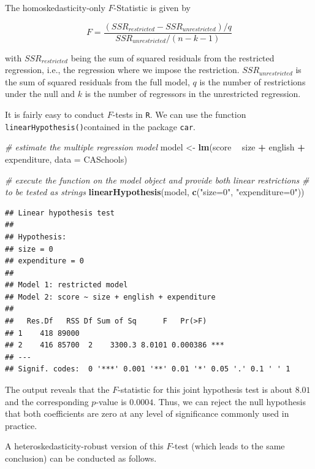 \documentclass[]{book}
\newenvironment{Shaded}{\begin{snugshade}}{\end{snugshade}}
\newcommand{\KeywordTok}[1]{\textcolor[rgb]{0.13,0.29,0.53}{\textbf{#1}}}
\newcommand{\DataTypeTok}[1]{\textcolor[rgb]{0.13,0.29,0.53}{#1}}
\newcommand{\StringTok}[1]{\textcolor[rgb]{0.31,0.60,0.02}{#1}}
\newcommand{\CommentTok}[1]{\textcolor[rgb]{0.56,0.35,0.01}{\textit{#1}}}
\newcommand{\OperatorTok}[1]{\textcolor[rgb]{0.81,0.36,0.00}{\textbf{#1}}}
\newcommand{\NormalTok}[1]{#1}
\theoremstyle{definition}
\theoremstyle{definition}
\theoremstyle{definition}
\theoremstyle{remark}
\begin{document}
The homoskedasticity-only \(F\)-Statistic is given by

\[ F = \frac{(SSR_{restricted} - SSR_{unrestricted})/q}{SSR_{unrestricted} / (n-k-1)} \]

with \(SSR_{restricted}\) being the sum of squared residuals from the
restricted regression, i.e., the regression where we impose the
restriction. \(SSR_{unrestricted}\) is the sum of squared residuals from
the full model, \(q\) is the number of restrictions under the null and
\(k\) is the number of regressors in the unrestricted regression.

It is fairly easy to conduct \(F\)-tests in \texttt{R}. We can use the
function \texttt{linearHypothesis()}contained in the package
\texttt{car}.

\begin{Shaded}
\begin{Highlighting}[]
\CommentTok{# estimate the multiple regression model}
\NormalTok{model <-}\StringTok{ }\KeywordTok{lm}\NormalTok{(score }\OperatorTok{~}\StringTok{ }\NormalTok{size }\OperatorTok{+}\StringTok{ }\NormalTok{english }\OperatorTok{+}\StringTok{ }\NormalTok{expenditure, }\DataTypeTok{data =}\NormalTok{ CASchools)}

\CommentTok{# execute the function on the model object and provide both linear restrictions }
\CommentTok{# to be tested as strings}
\KeywordTok{linearHypothesis}\NormalTok{(model, }\KeywordTok{c}\NormalTok{(}\StringTok{"size=0"}\NormalTok{, }\StringTok{"expenditure=0"}\NormalTok{))}
\end{Highlighting}
\end{Shaded}

\begin{verbatim}
## Linear hypothesis test
## 
## Hypothesis:
## size = 0
## expenditure = 0
## 
## Model 1: restricted model
## Model 2: score ~ size + english + expenditure
## 
##   Res.Df   RSS Df Sum of Sq      F   Pr(>F)    
## 1    418 89000                                 
## 2    416 85700  2    3300.3 8.0101 0.000386 ***
## ---
## Signif. codes:  0 '***' 0.001 '**' 0.01 '*' 0.05 '.' 0.1 ' ' 1
\end{verbatim}

The output reveals that the \(F\)-statistic for this joint hypothesis
test is about \(8.01\) and the corresponding \(p\)-value is \(0.0004\).
Thus, we can reject the null hypothesis that both coefficients are zero
at any level of significance commonly used in practice.

A heteroskedasticity-robust version of this \(F\)-test (which leads to
the same conclusion) can be conducted as follows.
\end{document}
